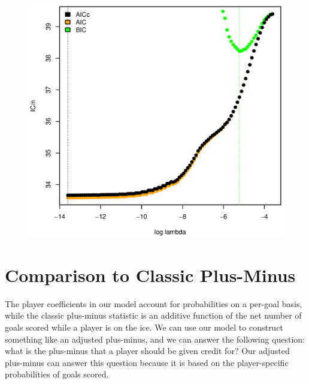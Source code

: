 \documentclass[11pt, fleqn]{article}
\begin{document}
\begin{figure}[!htb]
  \centering
  \includegraphics[scale=.5]{ic_pl_nhl_b.eps}
  \caption{}
  \label{fig:pl_ic_nhl_b}
\end{figure}



\section{Comparison to Classic Plus-Minus}

The player coefficients in our model account for probabilities on a per-goal basis, while the classic plus-minus statistic is an additive function of the net number of goals scored while a player is on the ice. We can use our model to construct something like an adjusted plus-minus, and we can answer the following question: what is the plus-minus that a player should be given credit for? Our adjusted plus-minus can answer this question because it is based on the player-specific probabilities of goals scored.
\end{document}
